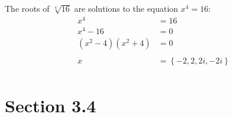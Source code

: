 \documentclass{exam}
\begin{document}
\begin{description}
      The roots of $\sqrt[4]{16}$ are solutions to the equation $x^4 = 16$:
      \begin{align*}
        x^4                &= 16 \\
        x^4 - 16           &= 0 \\
        (x^2 - 4)(x^2 + 4) &= 0 \\
        \\
        x                  &= \boxed{\left\{ -2, 2, 2i, -2i \right\} } \\
      \end{align*}
  \end{description}

  \pagebreak

  \section{Section 3.4}
\end{document}
